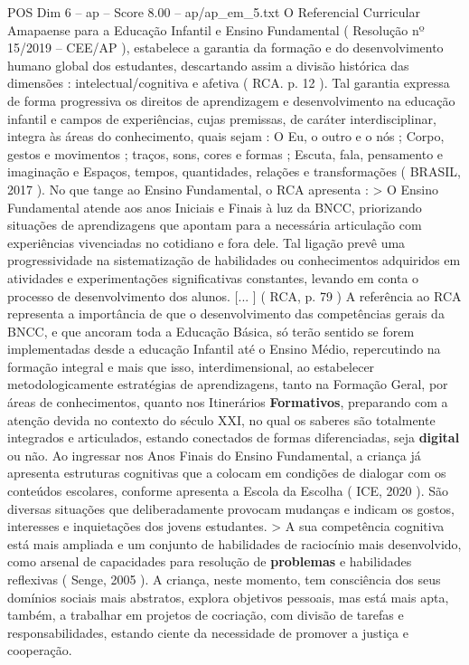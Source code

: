 \begin{textsample}{POS Dim 6 – ap – Score 8.00 – ap/ap\_em\_5.txt}
O Referencial Curricular Amapaense para a Educação Infantil e Ensino Fundamental ( Resolução nº 15/2019 – CEE/AP ), estabelece a garantia da formação e do desenvolvimento humano global dos estudantes, descartando assim a divisão histórica das dimensões : intelectual/cognitiva e afetiva ( RCA. p. 12 ).
Tal garantia expressa de forma progressiva os direitos de aprendizagem e desenvolvimento na educação infantil e campos de experiências, cujas premissas, de caráter interdisciplinar, integra às áreas do conhecimento, quais sejam : O Eu, o outro e o nós ; Corpo, gestos e movimentos ; traços, sons, cores e formas ; Escuta, fala, pensamento e imaginação e Espaços, tempos, quantidades, relações e transformações ( BRASIL, 2017 ).
No que tange ao Ensino Fundamental, o RCA apresenta : > O Ensino Fundamental atende aos anos Iniciais e Finais à luz da BNCC, priorizando situações de aprendizagens que apontam para a necessária articulação com experiências vivenciadas no cotidiano e fora dele.
Tal ligação prevê uma progressividade na sistematização de habilidades ou conhecimentos adquiridos em atividades e experimentações significativas constantes, levando em conta o processo de desenvolvimento dos alunos. [... ] ( RCA, p. 79 ) A referência ao RCA representa a importância de que o desenvolvimento das competências gerais da BNCC, e que ancoram toda a Educação Básica, só terão sentido se forem implementadas desde a educação Infantil até o Ensino Médio, repercutindo na formação integral e mais que isso, interdimensional, ao estabelecer metodologicamente estratégias de aprendizagens, tanto na Formação Geral, por áreas de conhecimentos, quanto nos Itinerários \textbf{Formativos}, preparando com a atenção devida no contexto do século XXI, no qual os saberes são totalmente integrados e articulados, estando conectados de formas diferenciadas, seja \textbf{digital} ou não.
Ao ingressar nos Anos Finais do Ensino Fundamental, a criança já apresenta estruturas cognitivas que a colocam em condições de dialogar com os conteúdos escolares, conforme apresenta a Escola da Escolha ( ICE, 2020 ).
São diversas situações que deliberadamente provocam mudanças e indicam os gostos, interesses e inquietações dos jovens estudantes. > A sua competência cognitiva está mais ampliada e um conjunto de habilidades de raciocínio mais desenvolvido, como arsenal de capacidades para resolução de \textbf{problemas} e habilidades reflexivas ( Senge, 2005 ).
A criança, neste momento, tem consciência dos seus domínios sociais mais abstratos, explora objetivos pessoais, mas está mais apta, também, a trabalhar em projetos de cocriação, com divisão de tarefas e responsabilidades, estando ciente da necessidade de promover a justiça e cooperação.

\end{textsample}
